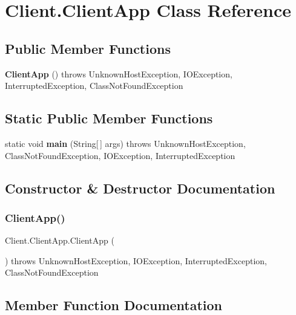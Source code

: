 \section{Client.\+Client\+App Class Reference}
\label{class_client_1_1_client_app}
\subsection*{Public Member Functions}
\begin{DoxyCompactItemize}
\item 
\textbf{ Client\+App} ()  throws Unknown\+Host\+Exception, I\+O\+Exception, Interrupted\+Exception, Class\+Not\+Found\+Exception 
\end{DoxyCompactItemize}
\subsection*{Static Public Member Functions}
\begin{DoxyCompactItemize}
\item 
static void \textbf{ main} (String[$\,$] args)  throws Unknown\+Host\+Exception, Class\+Not\+Found\+Exception, I\+O\+Exception, Interrupted\+Exception 
\end{DoxyCompactItemize}


\subsection{Constructor \& Destructor Documentation}
\mbox{\label{class_client_1_1_client_app_a694d96d2bd87640d3ab50f9177e65a18}} 
\subsubsection{Client\+App()}
{\footnotesize\ttfamily Client.\+Client\+App.\+Client\+App (\begin{DoxyParamCaption}{ }\end{DoxyParamCaption}) throws Unknown\+Host\+Exception, I\+O\+Exception, Interrupted\+Exception, Class\+Not\+Found\+Exception}



\subsection{Member Function Documentation}
\mbox{\label{class_client_1_1_client_app_a3be49c5ebe25406d76277a81d9dc3cb9}} 
